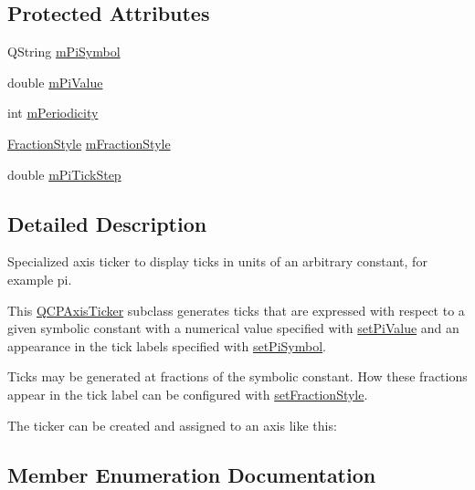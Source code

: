 \subsection*{Protected Attributes}
\begin{DoxyCompactItemize}
\item 
Q\+String \mbox{\hyperlink{class_q_c_p_axis_ticker_pi_a0962084571116e4d98e4dccc2e68f5ea}{m\+Pi\+Symbol}}
\item 
double \mbox{\hyperlink{class_q_c_p_axis_ticker_pi_ab3e899a3d23ada89eb48b465204b09ea}{m\+Pi\+Value}}
\item 
int \mbox{\hyperlink{class_q_c_p_axis_ticker_pi_af5372570aa91ef3b0586939d91c119db}{m\+Periodicity}}
\item 
\mbox{\hyperlink{class_q_c_p_axis_ticker_pi_a262f1534c7f0c79a7d5237f5d1e2c54c}{Fraction\+Style}} \mbox{\hyperlink{class_q_c_p_axis_ticker_pi_a34db3e41fbc1e91426841ca040930595}{m\+Fraction\+Style}}
\item 
double \mbox{\hyperlink{class_q_c_p_axis_ticker_pi_a943706b7796d778c62915498864bbeb8}{m\+Pi\+Tick\+Step}}
\end{DoxyCompactItemize}


\subsection{Detailed Description}
Specialized axis ticker to display ticks in units of an arbitrary constant, for example pi. 



This \mbox{\hyperlink{class_q_c_p_axis_ticker}{Q\+C\+P\+Axis\+Ticker}} subclass generates ticks that are expressed with respect to a given symbolic constant with a numerical value specified with \mbox{\hyperlink{class_q_c_p_axis_ticker_pi_a36ce0651d2ec92edd36feac1619c2468}{set\+Pi\+Value}} and an appearance in the tick labels specified with \mbox{\hyperlink{class_q_c_p_axis_ticker_pi_acfdcd4758a393bde4be12a50fb2017b5}{set\+Pi\+Symbol}}.

Ticks may be generated at fractions of the symbolic constant. How these fractions appear in the tick label can be configured with \mbox{\hyperlink{class_q_c_p_axis_ticker_pi_a760c8af6ca68178e607556c4e5049d71}{set\+Fraction\+Style}}.

The ticker can be created and assigned to an axis like this\+: 
\begin{DoxyCodeInclude}{0}
\end{DoxyCodeInclude}


\subsection{Member Enumeration Documentation}
\mbox{\label{class_q_c_p_axis_ticker_pi_a262f1534c7f0c79a7d5237f5d1e2c54c}} 
